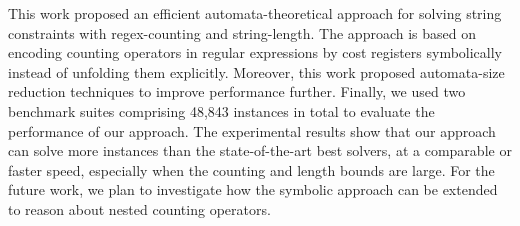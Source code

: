 

This work proposed an efficient automata-theoretical approach for solving string constraints with regex-counting and string-length. The approach is based on encoding counting operators in regular expressions by cost registers symbolically instead of unfolding them explicitly. Moreover, this work proposed automata-size reduction techniques to improve performance further. Finally, we used two benchmark suites comprising 48,843 instances in total to evaluate the performance of our approach. The experimental results show that our approach can solve more instances than the state-of-the-art best solvers, at a comparable or faster speed, especially when the counting and length bounds are large. 
For the future work, we plan to investigate how the symbolic approach can be extended to reason about nested counting operators. 
